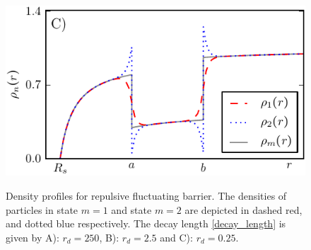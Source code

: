 \begin{minipage}[t]{0.5 \textwidth}
    \begin{figure}[H]
        \includegraphics[width = 1 \textwidth]{plots/d3.pdf}
    \end{figure}
\end{minipage}\hspace{0.07\textwidth}\begin{minipage}[t]{0.43 \textwidth}
    \begin{figure}[H]
        \caption{Density profiles for repulsive fluctuating barrier. The densities of particles in state $m=1$ and state $m=2$ are depicted in dashed red, and dotted blue respectively. The decay length \eqref{decay_length} is given by A): $r_d = 250$, \newline B): $r_d=2.5$ and C): $r_d=0.25$. \label{rsd}}
    \end{figure}
\end{minipage}



